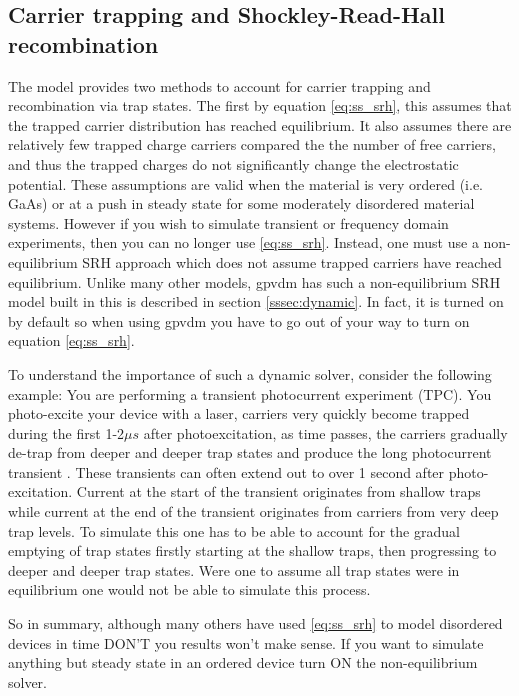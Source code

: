\subsection{Carrier trapping and Shockley-Read-Hall recombination}

The model provides two methods to account for carrier trapping and recombination via trap states.  The first by equation \ref{eq:ss_srh}, this assumes that the trapped carrier distribution has reached equilibrium.  It also assumes there are relatively few trapped charge carriers compared the the number of free carriers, and thus the trapped charges do not significantly change the electrostatic potential.  These assumptions are valid when the material is very ordered (i.e. GaAs) or at a push in steady state for some moderately disordered material systems. However if you wish to simulate transient or frequency domain experiments, then you can no longer use \ref{eq:ss_srh}.  Instead, one must use a non-equilibrium SRH approach which does not assume trapped carriers have reached equilibrium.  Unlike many other models, gpvdm has such a non-equilibrium SRH model built in this is described in section \ref{sssec:dynamic}. In fact, it is turned on by default so when using gpvdm you have to go out of your way to turn on equation \ref{eq:ss_srh}.

To understand the importance of such a dynamic solver, consider the following example: You are performing a transient photocurrent experiment (TPC). You photo-excite your device with a laser, carriers very quickly become trapped during the first 1-2$\mu s$ after photoexcitation, as time passes, the carriers gradually de-trap from deeper and deeper trap states and produce the long photocurrent transient \cite{mackenzie2013interpreting}. These transients can often extend out to over 1 second after photo-excitation.  Current at the start of the transient originates from shallow traps while current at the end of the transient originates from carriers from very deep trap levels. To simulate this one has to be able to account for the gradual emptying of trap states firstly starting at the shallow traps, then progressing to deeper and deeper trap states. Were one to assume all trap states were in equilibrium one would not be able to simulate this process.

So in summary, although many others have used \ref{eq:ss_srh} to model disordered devices in time DON'T you results won't make sense. If you want to simulate anything but steady state in an ordered device turn ON the non-equilibrium solver.
